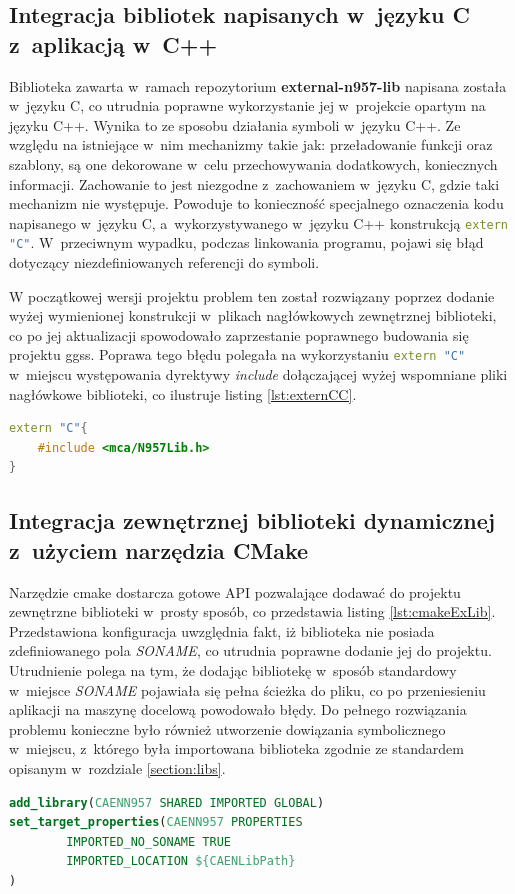 \subsection{Integracja bibliotek napisanych w~języku C z~aplikacją w~C++}
Biblioteka zawarta w~ramach repozytorium \textbf{external-n957-lib} napisana została w~języku C, co utrudnia poprawne wykorzystanie jej w~projekcie opartym na języku C++. Wynika to ze sposobu działania symboli w~języku C++. Ze względu na istniejące w~nim mechanizmy takie jak: przeładowanie funkcji oraz szablony, są one dekorowane w~celu przechowywania dodatkowych, koniecznych informacji. Zachowanie to jest niezgodne z~zachowaniem w~języku C, gdzie taki mechanizm nie występuje. Powoduje to konieczność specjalnego oznaczenia kodu napisanego w~języku C, a~wykorzystywanego w~języku C++ konstrukcją \lstinline[language=c++]{extern "C"}. W~przeciwnym wypadku, podczas linkowania programu, pojawi się błąd dotyczący niezdefiniowanych referencji do symboli.

W początkowej wersji projektu problem ten został rozwiązany poprzez dodanie wyżej wymienionej konstrukcji w~plikach nagłówkowych zewnętrznej biblioteki, co po jej aktualizacji spowodowało zaprzestanie poprawnego budowania się projektu \gls*{ggss}. Poprawa tego błędu polegała na wykorzystaniu \lstinline[language=c++]{extern "C"} w~miejscu występowania dyrektywy \textit{include} dołączającej wyżej wspomniane pliki nagłówkowe biblioteki, co ilustruje listing \ref{lst:externCC}.

\begin{lstlisting}[language=c++, caption={Wykorzystanie konstrukcji \lstinline{extern "C"} w~celu integracji biblioteki napisanej w~języku C z~komponentem \textbf{mca-lib}}, label={lst:externCC}]
extern "C"{ 
    #include <mca/N957Lib.h>
}
\end{lstlisting}

\newpage

\subsection{Integracja zewnętrznej biblioteki dynamicznej z~użyciem narzędzia CMake}
Narzędzie \gls*{cmake} dostarcza gotowe API pozwalające dodawać do projektu zewnętrzne biblioteki w~prosty sposób, co przedstawia listing \ref{lst:cmakeExLib}. Przedstawiona konfiguracja uwzględnia fakt, iż biblioteka nie posiada zdefiniowanego pola \textit{SONAME}, co utrudnia poprawne dodanie jej do projektu. Utrudnienie polega na tym, że dodając bibliotekę w~sposób standardowy w~miejsce \textit{SONAME} pojawiała się pełna ścieżka do pliku, co po przeniesieniu aplikacji na maszynę docelową powodowało błędy. Do pełnego rozwiązania problemu konieczne było również utworzenie dowiązania symbolicznego w~miejscu, z~którego była importowana biblioteka zgodnie ze standardem opisanym w~rozdziale \ref{section:libs}.

\begin{lstlisting}[language=cmake, caption={Dodanie zewnętrznej biblioteki do projektu za pomocą narzędzia \gls*{cmake}}, label={lst:cmakeExLib}]
add_library(CAENN957 SHARED IMPORTED GLOBAL)
set_target_properties(CAENN957 PROPERTIES
        IMPORTED_NO_SONAME TRUE
        IMPORTED_LOCATION ${CAENLibPath}
)
\end{lstlisting}
